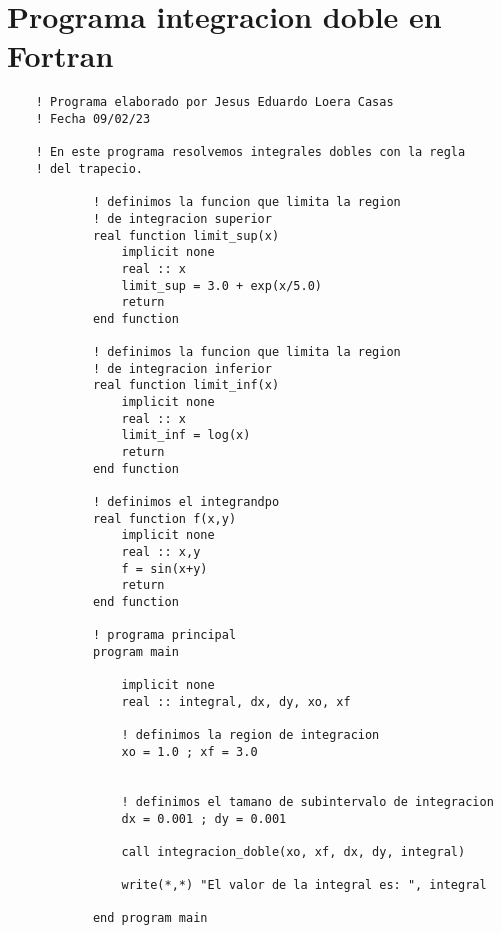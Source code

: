 \section{Programa integracion doble en Fortran}


\begin{lstlisting}
    ! Programa elaborado por Jesus Eduardo Loera Casas
    ! Fecha 09/02/23
    
    ! En este programa resolvemos integrales dobles con la regla
    ! del trapecio.
    
            ! definimos la funcion que limita la region
            ! de integracion superior 
            real function limit_sup(x)
                implicit none
                real :: x
                limit_sup = 3.0 + exp(x/5.0)
                return
            end function
    
            ! definimos la funcion que limita la region
            ! de integracion inferior 
            real function limit_inf(x)
                implicit none
                real :: x
                limit_inf = log(x)
                return
            end function
    
            ! definimos el integrandpo 
            real function f(x,y)
                implicit none
                real :: x,y
                f = sin(x+y)
                return
            end function
     
            ! programa principal
            program main
     
                implicit none
                real :: integral, dx, dy, xo, xf
    
                ! definimos la region de integracion
                xo = 1.0 ; xf = 3.0
    
    
                ! definimos el tamano de subintervalo de integracion
                dx = 0.001 ; dy = 0.001
    
                call integracion_doble(xo, xf, dx, dy, integral)
    
                write(*,*) "El valor de la integral es: ", integral
     
            end program main
    

\end{lstlisting}
